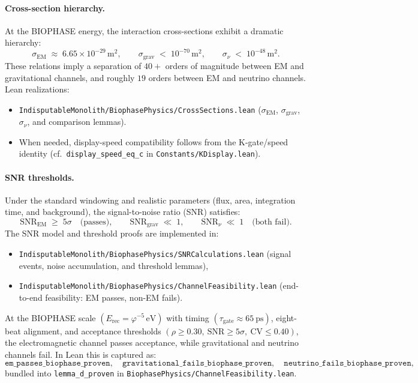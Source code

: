 \documentclass[12pt,a4paper]{article}
\begin{document}
\paragraph{Cross-section hierarchy.}
At the BIOPHASE energy, the interaction cross-sections exhibit a dramatic hierarchy:
\[
  \sigma_{\mathrm{EM}} \;\approx\; 6.65\times 10^{-29}\,\mathrm{m}^2,
  \qquad
  \sigma_{\mathrm{grav}} \;<\; 10^{-70}\,\mathrm{m}^2,
  \qquad
  \sigma_{\nu} \;<\; 10^{-48}\,\mathrm{m}^2.
\]
These relations imply a separation of \(40+\) orders of magnitude between EM and gravitational channels, and roughly \(19\) orders between EM and neutrino channels. Lean realizations:
\begin{itemize}
  \item \texttt{IndisputableMonolith/BiophasePhysics/CrossSections.lean} (\(\sigma_{\mathrm{EM}}\), \(\sigma_{\mathrm{grav}}\), \(\sigma_{\nu}\), and comparison lemmas).
  \item When needed, display-speed compatibility follows from the K-gate/speed identity (cf.\ \texttt{display\_speed\_eq\_c} in \texttt{Constants/KDisplay.lean}).
\end{itemize}

\paragraph{SNR thresholds.}
Under the standard windowing and realistic parameters (flux, area, integration time, and background), the signal-to-noise ratio (SNR) satisfies:
\[
  \mathrm{SNR}_{\mathrm{EM}} \;\ge\; 5\sigma
  \quad\text{(passes)}, 
  \qquad
  \mathrm{SNR}_{\mathrm{grav}} \;\ll\; 1,
  \qquad
  \mathrm{SNR}_{\nu} \;\ll\; 1
  \quad\text{(both fail).}
\]
The SNR model and threshold proofs are implemented in:
\begin{itemize}
  \item \texttt{IndisputableMonolith/BiophasePhysics/SNRCalculations.lean} (signal events, noise accumulation, and threshold lemmas),
  \item \texttt{IndisputableMonolith/BiophasePhysics/ChannelFeasibility.lean} (end-to-end feasibility: EM passes, non-EM fails).
\end{itemize}

\begin{theorem}
\label{thm:biophase-feasibility}
At the BIOPHASE scale \((E_{\mathrm{rec}}=\varphi^{-5}\,\mathrm{eV})\) with timing \((\tau_{\mathrm{gate}}\approx 65~\mathrm{ps})\), eight-beat alignment, and acceptance thresholds \((\rho\ge 0.30,~\mathrm{SNR}\ge 5\sigma,~\mathrm{CV}\le 0.40)\), the electromagnetic channel passes acceptance, while gravitational and neutrino channels fail. In Lean this is captured as:
\[
  \texttt{em\_passes\_biophase\_proven},\quad
  \texttt{gravitational\_fails\_biophase\_proven},\quad
  \texttt{neutrino\_fails\_biophase\_proven},
\]
bundled into \texttt{lemma\_d\_proven} in \texttt{BiophasePhysics/ChannelFeasibility.lean}.
\end{theorem}
\end{document}
